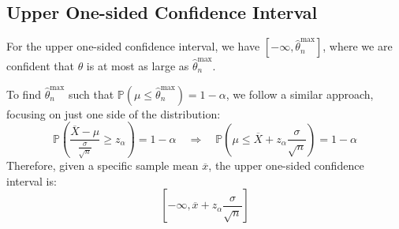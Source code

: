 \subsection{Upper One-sided Confidence Interval}
For the upper one-sided confidence interval, we have \([-\infty, \hat{\theta}_n^{\max}]\), where we are confident that \(\theta\) is at most as large as \(\hat{\theta}_n^{\max}\). 

To find \(\hat{\theta}_n^{\max}\) such that \(\mathbb{P}(\mu \leq \hat{\theta}_n^{\max}) = 1 - \alpha\), we follow a similar approach, focusing on just one side of the distribution:
\[
  \mathbb{P}\left(\frac{\overline{X} - \mu}{\frac{\sigma}{\sqrt{n}}} \geq z_{\alpha}\right) = 1 - \alpha \quad \Longrightarrow \quad
  \mathbb{P}\left(\mu \leq \overline{X} + z_{\alpha} \frac{\sigma}{\sqrt{n}}\right) = 1 - \alpha
\]
Therefore, given a specific sample mean \(\overline{x}\), the upper one-sided confidence interval is:
\[
  \left[-\infty, \overline{x} + z_{\alpha} \frac{\sigma}{\sqrt{n}}\right]
\]
